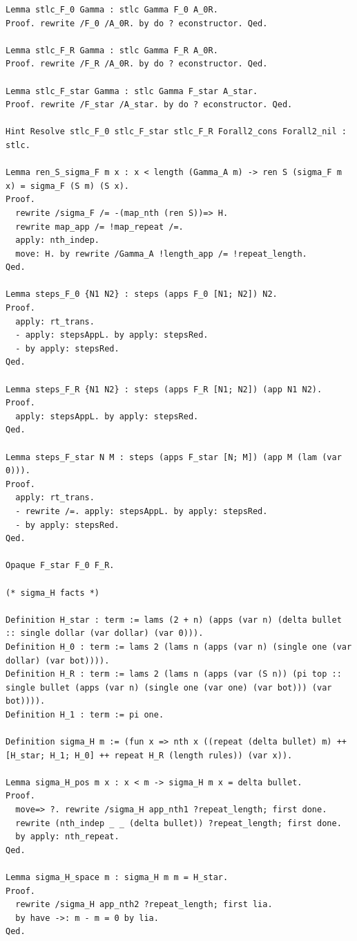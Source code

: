 \begin{lstlisting}
Lemma stlc_F_0 Gamma : stlc Gamma F_0 A_0R.
Proof. rewrite /F_0 /A_0R. by do ? econstructor. Qed.

Lemma stlc_F_R Gamma : stlc Gamma F_R A_0R.
Proof. rewrite /F_R /A_0R. by do ? econstructor. Qed.

Lemma stlc_F_star Gamma : stlc Gamma F_star A_star.
Proof. rewrite /F_star /A_star. by do ? econstructor. Qed.

Hint Resolve stlc_F_0 stlc_F_star stlc_F_R Forall2_cons Forall2_nil : stlc.

Lemma ren_S_sigma_F m x : x < length (Gamma_A m) -> ren S (sigma_F m x) = sigma_F (S m) (S x).
Proof.
  rewrite /sigma_F /= -(map_nth (ren S))=> H.
  rewrite map_app /= !map_repeat /=.
  apply: nth_indep.
  move: H. by rewrite /Gamma_A !length_app /= !repeat_length.
Qed.

Lemma steps_F_0 {N1 N2} : steps (apps F_0 [N1; N2]) N2.
Proof.
  apply: rt_trans.
  - apply: stepsAppL. by apply: stepsRed.
  - by apply: stepsRed.
Qed.

Lemma steps_F_R {N1 N2} : steps (apps F_R [N1; N2]) (app N1 N2).
Proof.
  apply: stepsAppL. by apply: stepsRed.
Qed.

Lemma steps_F_star N M : steps (apps F_star [N; M]) (app M (lam (var 0))).
Proof.
  apply: rt_trans.
  - rewrite /=. apply: stepsAppL. by apply: stepsRed.
  - by apply: stepsRed.
Qed.

Opaque F_star F_0 F_R.

(* sigma_H facts *)

Definition H_star : term := lams (2 + n) (apps (var n) (delta bullet :: single dollar (var dollar) (var 0))).
Definition H_0 : term := lams 2 (lams n (apps (var n) (single one (var dollar) (var bot)))).
Definition H_R : term := lams 2 (lams n (apps (var (S n)) (pi top :: single bullet (apps (var n) (single one (var one) (var bot))) (var bot)))).
Definition H_1 : term := pi one.

Definition sigma_H m := (fun x => nth x ((repeat (delta bullet) m) ++ [H_star; H_1; H_0] ++ repeat H_R (length rules)) (var x)).

Lemma sigma_H_pos m x : x < m -> sigma_H m x = delta bullet.
Proof.
  move=> ?. rewrite /sigma_H app_nth1 ?repeat_length; first done.
  rewrite (nth_indep _ _ (delta bullet)) ?repeat_length; first done.
  by apply: nth_repeat.
Qed.

Lemma sigma_H_space m : sigma_H m m = H_star.
Proof.
  rewrite /sigma_H app_nth2 ?repeat_length; first lia.
  by have ->: m - m = 0 by lia.
Qed.


\end{lstlisting}
